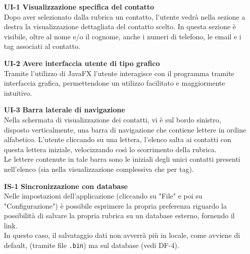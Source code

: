 \begin{tcolorbox}[colback=white,colframe=black!80!white,title=\textbf{Interfaccia Utente UI}]
	\begin{itemize}[itemsep=2pt, topsep=0pt]
		\item[\textbf{UI-1}] \textbf{Visualizzazione specifica del contatto}
		\\Dopo aver selezionato dalla rubrica un contatto, l’utente vedrà nella sezione a destra la visualizzazione dettagliata del contatto scelto. In questa sezione è visibile, oltre al nome e/o il cognome, anche i numeri di telefono, le email e i tag associati al contatto.
		
		\item[\textbf{UI-2}] \textbf{Avere interfaccia utente di tipo grafico} 
		\\Tramite l’utilizzo di JavaFX l’utente interagisce con il programma tramite interfaccia grafica, permettendone un utilizzo facilitato e maggiormente intuitivo.
		
		\item[\textbf{UI-3}] \textbf{Barra laterale di navigazione}
		\\Nella schermata di visualizzazione dei contatti, vi è sul bordo sinistro, disposto verticalmente, una barra di navigazione che contiene lettere in ordine alfabetico. L’utente cliccando su una lettera, l’elenco salta ai contatti con questa lettera iniziale, velocizzando così lo scorrimento della rubrica.
		\\Le lettere contenute in tale barra sono le iniziali degli unici contatti presenti nell’elenco (sia nella visualizzazione complessiva che per tag).
		
	\end{itemize}
\end{tcolorbox}

\begin{tcolorbox}[colback=white,colframe=black!80!white,title=\textbf{Interfacce con sistemi esterni IS}]
	\begin{itemize}[itemsep=2pt, topsep=0pt]
		\item[\textbf{IS-1}] \textbf{Sincronizzazione con database}
		\\Nelle impostazioni dell’applicazione (cliccando su "File" e poi su "Configurazione") è possibile esprimere la propria preferenza riguardo la possibilità di salvare la propria rubrica su un database esterno, fornendo il link. 
		\\In questo caso, il salvataggio dati non avverrà più in locale, come avviene di default, (tramite file \texttt{.bin}) ma sul database (vedi DF-4).
	\end{itemize}
\end{tcolorbox}


